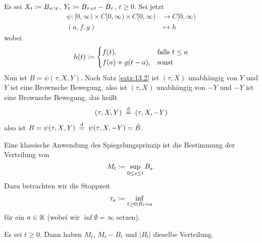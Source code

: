 \documentclass[a4paper,twoside,DIV15,BCOR12mm]{scrbook}
\begin{document}
\begin{center}
\end{center}

\begin{beweis}
Es sei $X_t \da B_{\tau\cap t}$, $Y_t\da B_{\tau+t}-B_\tau$, $t\ge 0$. Sei jetzt 
\begin{align*}
\psi: [0,\infty) \times C[0,\infty) \times C[0,\infty) &\to C[0,\infty) \\
(a, f , g) &\mapsto h
\end{align*}
wobei
\begin{align*}
h(t) \da 
\begin{cases}
f(t), &\text{falls } t\le a \\
f(a) + g(t-a), &\text{sonst}
\end{cases}
\end{align*}
Nun ist $B= \psi(\tau, X, Y)$. Nach Satz \ref{satz:13.2} ist $(\tau,X)$ unabhängig von $Y$ und $Y$ ist eine Brownsche Bewegung, also ist $(\tau, X)$ unabhängig von $-Y$ und $-Y$ ist eine Brownsche Bewegung, das heißt
\begin{align*}
(\tau,X,Y) \gleichnach{d} (\tau,X,-Y)
\end{align*}
also ist $B=\psi(\tau,X,Y) \gleichnach{d} \psi(\tau,X,-Y)=\tilde B$.
\end{beweis}

Eine klassische Anwendung des Spiegelungsprinzip ist die Bestimmung der Verteilung von 
\[
M_t \da \sup_{0\le s\le t}B_s.
\]
Dazu betrachten wir die Stoppzeit 
\begin{align*}
\tau_a \da \inf_{t\ge 0\mid B_t=a}
\end{align*}
für ein $a\in \mathbb{R}$ (wobei wir $\inf\emptyset = \infty$ setzen).

\begin{satz}
Es sei $t\ge 0$. Dann haben $M_t$, $M_t-B_t$ und $|B_t|$ dieselbe Verteilung.
\end{satz}
\end{document}
